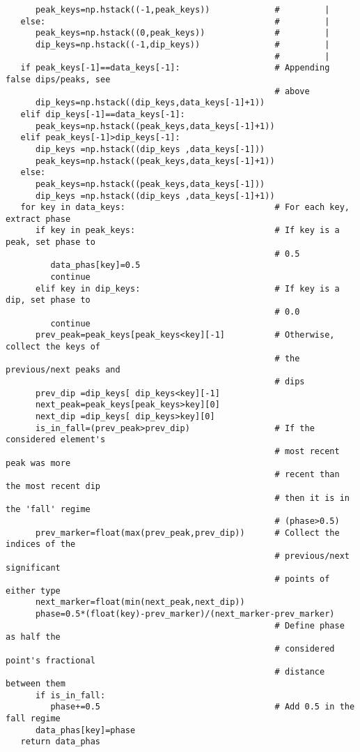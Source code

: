 \begin{verbatim}
      peak_keys=np.hstack((-1,peak_keys))             #         |
   else:                                              #         |
      peak_keys=np.hstack((0,peak_keys))              #         |
      dip_keys=np.hstack((-1,dip_keys))               #         |
                                                      #         |
   if peak_keys[-1]==data_keys[-1]:                   # Appending false dips/peaks, see
                                                      # above
      dip_keys=np.hstack((dip_keys,data_keys[-1]+1))
   elif dip_keys[-1]==data_keys[-1]:
      peak_keys=np.hstack((peak_keys,data_keys[-1]+1))
   elif peak_keys[-1]>dip_keys[-1]:
      dip_keys =np.hstack((dip_keys ,data_keys[-1]))
      peak_keys=np.hstack((peak_keys,data_keys[-1]+1)) 
   else:
      peak_keys=np.hstack((peak_keys,data_keys[-1]))
      dip_keys =np.hstack((dip_keys ,data_keys[-1]+1))
   for key in data_keys:                              # For each key, extract phase
      if key in peak_keys:                            # If key is a peak, set phase to
                                                      # 0.5
         data_phas[key]=0.5
         continue
      elif key in dip_keys:                           # If key is a dip, set phase to 
                                                      # 0.0
         continue
      prev_peak=peak_keys[peak_keys<key][-1]          # Otherwise, collect the keys of
                                                      # the previous/next peaks and
                                                      # dips
      prev_dip =dip_keys[ dip_keys<key][-1]
      next_peak=peak_keys[peak_keys>key][0]
      next_dip =dip_keys[ dip_keys>key][0]
      is_in_fall=(prev_peak>prev_dip)                 # If the considered element's
                                                      # most recent peak was more 
                                                      # recent than the most recent dip
                                                      # then it is in the 'fall' regime
                                                      # (phase>0.5)
      prev_marker=float(max(prev_peak,prev_dip))      # Collect the indices of the
                                                      # previous/next significant
                                                      # points of either type
      next_marker=float(min(next_peak,next_dip))
      phase=0.5*(float(key)-prev_marker)/(next_marker-prev_marker)
                                                      # Define phase as half the
                                                      # considered point's fractional
                                                      # distance between them
      if is_in_fall:
         phase+=0.5                                   # Add 0.5 in the fall regime
      data_phas[key]=phase
   return data_phas  


\end{verbatim}
